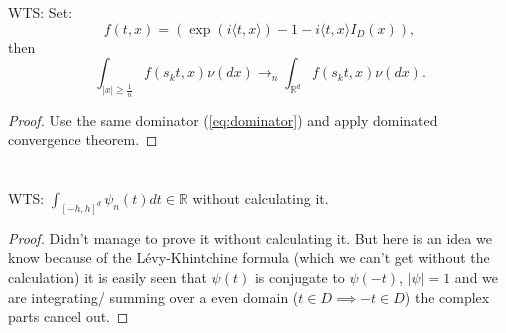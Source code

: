\documentclass[a4paper,11pt]{article}
\begin{document}
\section{}
WTS:
Set:
\begin{equation}
    f(t,x) =  ( \exp ( i \langle t, x \rangle)-1-i \langle t, x \rangle I_{D} ( x ) ),
\end{equation}
then
\begin{equation}
    \int_{|x| \ge \frac{1}{n} } f(s_{k}t,x) \nu( d x )\rightarrow_{n} \int_{\mathbb{R}^{d}} f(s_{k}t,x) \nu( d x )
    .
\end{equation}
\begin{proof}
    Use the same dominator (\ref{eq:dominator}) and apply dominated convergence theorem.
\end{proof}

\section{}
WTS: $\int_{[-h,h]^{d}} \psi_{n}(t) dt  \in  \mathbb{R}$ without calculating it.
\begin{proof}
    Didn't manage to prove it without calculating it. But here is an idea we know
    because of the Lévy-Khintchine formula (which we can't get without the calculation) it is
    easily seen that $\psi(t)$ is conjugate to $\psi(-t)$,  $|\psi|=1 $ and we are integrating/ summing over
    a even domain ($t \in D \implies -t \in D$) the complex parts cancel out.
\end{proof}
\end{document}
